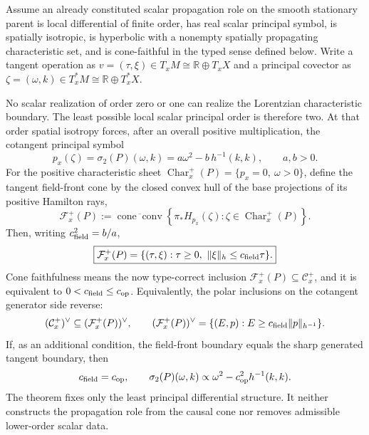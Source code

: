 \documentclass[12pt,a4paper]{article}
\begin{document}
\begin{theorem}
\label{p3:thm:minimal-local-scalar-cone-order}
Assume an already constituted scalar propagation role on the smooth stationary
parent is local differential of finite order, has real scalar principal
symbol, is spatially isotropic, is hyperbolic with a nonempty spatially
propagating characteristic set, and is cone-faithful in the typed sense
defined below.  Write a tangent operation as
\(v=(\tau,\xi)\in T_xM\cong\mathbb R\oplus T_xX\) and a principal covector
as \(\zeta=(\omega,k)\in T_x^*M\cong\mathbb R\oplus T_x^*X\).

No scalar realization of order zero or one can realize the Lorentzian
characteristic boundary.  The least possible local scalar principal order is
therefore two.  At that order spatial isotropy forces, after an overall
positive multiplication, the cotangent principal symbol
\[
  p_x(\zeta)=\sigma_2(P)(\omega,k)
  =a\omega^2-b\,h^{-1}(k,k),
  \qquad a,b>0.
\]
For the positive characteristic sheet
\(\operatorname{Char}_x^+(P)=\{p_x=0,\ \omega>0\}\), define the tangent
field-front cone by the closed convex hull of the base projections of its
positive Hamilton rays,
\begin{equation}
\label{p3e:eq:typed-field-front-cone}
 \mathcal F_x^+(P)
 :=\overline{\operatorname{cone}\operatorname{conv}}
 \left\{\pi_*H_{p_x}(\zeta):
 \zeta\in\operatorname{Char}_x^+(P)\right\}.
\end{equation}
Then, writing \(c_{\rm field}^2=b/a\),
\[
 \boxed{\mathcal F_x^+(P)
 =\{(\tau,\xi):\tau\ge0,\
       \|\xi\|_h\le c_{\rm field}\tau\}.}
\]
Cone faithfulness means the now type-correct inclusion
\(\mathcal F_x^+(P)\subseteq\mathcal C_x^+\), and it is equivalent to
\(0<c_{\rm field}\le c_{\rm op}\).  Equivalently, the polar inclusions on
the cotangent generator side reverse:
\[
 (\mathcal C_x^+)^\vee\subseteq(\mathcal F_x^+(P))^\vee,
 \qquad
 (\mathcal F_x^+(P))^\vee
 =\{(E,p):E\ge c_{\rm field}\|p\|_{h^{-1}}\}.
\]
If, as an additional condition, the field-front boundary equals the sharp
generated tangent boundary, then
\[
  c_{\rm field}=c_{\rm op},
  \qquad
  \sigma_2(P)(\omega,k)
  \propto \omega^2-c_{\rm op}^2h^{-1}(k,k).
\]
The theorem fixes only the least principal differential structure.  It neither
constructs the propagation role from the causal cone nor removes admissible
lower-order scalar data.
\end{theorem}
\end{document}
